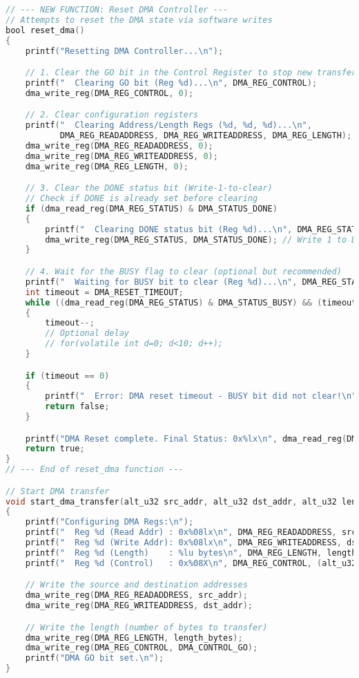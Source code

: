 \begin{lstlisting}[language=C, caption={hello\_world.c - Nios V DMA Test Application}, label=lst:c_helloworld]
// --- NEW FUNCTION: Reset DMA Controller ---
// Attempts to reset the DMA state via software writes
bool reset_dma()
{
    printf("Resetting DMA Controller...\n");

    // 1. Clear the GO bit in the Control Register to stop new transfers
    printf("  Clearing GO bit (Reg %d)...\n", DMA_REG_CONTROL);
    dma_write_reg(DMA_REG_CONTROL, 0);

    // 2. Clear configuration registers
    printf("  Clearing Address/Length Regs (%d, %d, %d)...\n",
           DMA_REG_READADDRESS, DMA_REG_WRITEADDRESS, DMA_REG_LENGTH);
    dma_write_reg(DMA_REG_READADDRESS, 0);
    dma_write_reg(DMA_REG_WRITEADDRESS, 0);
    dma_write_reg(DMA_REG_LENGTH, 0);

    // 3. Clear the DONE status bit (Write-1-to-clear)
    // Check if DONE is already set before clearing
    if (dma_read_reg(DMA_REG_STATUS) & DMA_STATUS_DONE)
    {
        printf("  Clearing DONE status bit (Reg %d)...\n", DMA_REG_STATUS);
        dma_write_reg(DMA_REG_STATUS, DMA_STATUS_DONE); // Write 1 to DONE bit
    }

    // 4. Wait for the BUSY flag to clear (optional but recommended)
    printf("  Waiting for BUSY bit to clear (Reg %d)...\n", DMA_REG_STATUS);
    int timeout = DMA_RESET_TIMEOUT;
    while ((dma_read_reg(DMA_REG_STATUS) & DMA_STATUS_BUSY) && (timeout > 0))
    {
        timeout--;
        // Optional delay
        // for(volatile int d=0; d<10; d++);
    }

    if (timeout == 0)
    {
        printf("  Error: DMA reset timeout - BUSY bit did not clear!\n");
        return false;
    }

    printf("DMA Reset complete. Final Status: 0x%lx\n", dma_read_reg(DMA_REG_STATUS));
    return true;
}
// --- End of reset_dma function ---

// Start DMA transfer
void start_dma_transfer(alt_u32 src_addr, alt_u32 dst_addr, alt_u32 length_bytes)
{
    printf("Configuring DMA Regs:\n");
    printf("  Reg %d (Read Addr) : 0x%08lx\n", DMA_REG_READADDRESS, src_addr);
    printf("  Reg %d (Write Addr): 0x%08lx\n", DMA_REG_WRITEADDRESS, dst_addr);
    printf("  Reg %d (Length)    : %lu bytes\n", DMA_REG_LENGTH, length_bytes);
    printf("  Reg %d (Control)   : 0x%08X\n", DMA_REG_CONTROL, (alt_u32)DMA_CONTROL_GO);

    // Write the source and destination addresses
    dma_write_reg(DMA_REG_READADDRESS, src_addr);
    dma_write_reg(DMA_REG_WRITEADDRESS, dst_addr);

    // Write the length (number of bytes to transfer)
    dma_write_reg(DMA_REG_LENGTH, length_bytes);
    dma_write_reg(DMA_REG_CONTROL, DMA_CONTROL_GO);
    printf("DMA GO bit set.\n");
}


\end{lstlisting}
